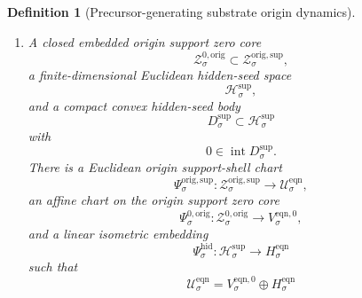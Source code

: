 \documentclass[11pt]{article}
\newcommand{\EqnSpace}[1]{\mathcal U_{#1}^{\mathrm{eqn}}}
\newcommand{\EqnHidden}[1]{H_{#1}^{\mathrm{eqn}}}
\newcommand{\EqnZero}[1]{V_{#1}^{\mathrm{eqn},0}}
\newcommand{\ResSpace}[1]{\mathcal U_{#1}^{\mathrm{sup,res}}}
\newcommand{\ResBody}[1]{\mathcal B_{#1}^{\mathrm{sup,res}}}
\newcommand{\ResPair}[1]{\mathfrak m_{#1}^{\mathrm{sup,res}}}
\newcommand{\ResSection}[1]{\Theta_{#1}^{\mathrm{sup,res}}}
\newcommand{\ResData}[1]{\Lambda_{#1}^{\mathrm{sup,dat}}}
\newcommand{\ResShellMap}[1]{\Lambda_{#1}^{\mathrm{sup,sh}}}
\newcommand{\ResShellSet}[1]{\mathcal Z_{#1}^{\mathrm{sup,res}}}
\newcommand{\SeedHidden}[1]{\mathcal H_{#1}^{\mathrm{sup}}}
\newcommand{\SeedHiddenBody}[1]{D_{#1}^{\mathrm{sup}}}
\newcommand{\HiddenChart}[1]{\Psi_{#1}^{\mathrm{hid}}}
\newcommand{\PrecSupportShell}[1]{\mathcal Z_{#1}^{\mathrm{prec,sup}}}
\newcommand{\OrigProj}[1]{\Pi_{#1}^{\mathrm{orig}}}
\newcommand{\OrigShellSet}[1]{\mathcal Z_{#1}^{\mathrm{orig}}}
\newcommand{\OrigChart}[1]{\Xi_{#1}^{\mathrm{orig}}}
\newcommand{\OrigSupport}[1]{\Theta_{#1}^{\mathrm{orig,sup}}}
\newcommand{\OrigSupportShell}[1]{\mathcal Z_{#1}^{\mathrm{orig,sup}}}
\newcommand{\OrigZeroCore}[1]{\mathcal Z_{#1}^{0,\mathrm{orig}}}
\newcommand{\OrigEqChart}[1]{\Psi_{#1}^{\mathrm{orig,sup}}}
\newcommand{\OrigZeroChart}[1]{\Psi_{#1}^{0,\mathrm{orig}}}
\newtheorem{definition}{Definition}
\begin{document}
\begin{definition}[Precursor-generating substrate origin dynamics]
\begin{enumerate}
\begin{equation}
    =
    \OrigSupport{\sigma}.
    \label{eq:origsupporttransport}
    \end{equation}
    Define the exact origin support shell
    \begin{equation}
    \OrigSupportShell{\sigma}
    \equiv
    \bigl(\OrigSupport{\sigma}\bigr)^{-1}(0)\cap\OrigShellSet{\sigma},
    \label{eq:origsupportshell}
    \end{equation}
    and assume
    \begin{equation}
    \ResShellSet{\sigma}
    \equiv
    \bigl(\ResSection{\sigma}\bigr)^{-1}(0)\cap\ResBody{\sigma}
    =
    \OrigChart{\sigma}\bigl(\OrigSupportShell{\sigma}\bigr).
    \label{eq:origtransportedsupportshell}
    \end{equation}
    Assume there exists \(\nu_{\sigma}^{\mathrm{sup}}>0\) such that
    \begin{equation}
    \ResPair{\sigma}\bigl(\ResSection{\sigma}(u),\ResSection{\sigma}(u)\bigr)
    \ge
    \nu_{\sigma}^{\mathrm{sup}}\,
    \operatorname{dist}\bigl(u,\ResShellSet{\sigma}\bigr)^{2}
    \qquad
    \text{for all }u\in\ResBody{\sigma}.
    \label{eq:orignormal}
    \end{equation}
    Assume the restriction of \(\OrigProj{\sigma}\) to \(\OrigSupportShell{\sigma}\) is a diffeomorphism onto its image
    \[
    \PrecSupportShell{\sigma}
    \equiv
    \OrigProj{\sigma}\bigl(\OrigSupportShell{\sigma}\bigr).
    \]
    The transported symmetry and time-reversal actions act linearly on \(\ResSpace{\sigma}\), preserving \(\ResBody{\sigma}\), \(\ResShellSet{\sigma}\), \(\ResSection{\sigma}\), \(\ResData{\sigma}\), and \(\ResShellMap{\sigma}\).
    \item A closed embedded origin support zero core
    \[
    \OrigZeroCore{\sigma}\subset\OrigSupportShell{\sigma},
    \]
    a finite-dimensional Euclidean hidden-seed space
    \[
    \SeedHidden{\sigma},
    \]
    and a compact convex hidden-seed body
    \[
    \SeedHiddenBody{\sigma}\subset\SeedHidden{\sigma}
    \]
    with
    \[
    0\in\operatorname{int}\SeedHiddenBody{\sigma}.
    \]
    There is a Euclidean origin support-shell chart
    \[
    \OrigEqChart{\sigma}:\OrigSupportShell{\sigma}\to\EqnSpace{\sigma},
    \]
    an affine chart on the origin support zero core
    \[
    \OrigZeroChart{\sigma}:\OrigZeroCore{\sigma}\to\EqnZero{\sigma},
    \]
    and a linear isometric embedding
    \[
    \HiddenChart{\sigma}:\SeedHidden{\sigma}\to\EqnHidden{\sigma}
    \]
    such that
    \[
    \EqnSpace{\sigma}
    =
    \EqnZero{\sigma}\oplus\EqnHidden{\sigma}
\]
\end{enumerate}
\end{definition}
\end{document}

